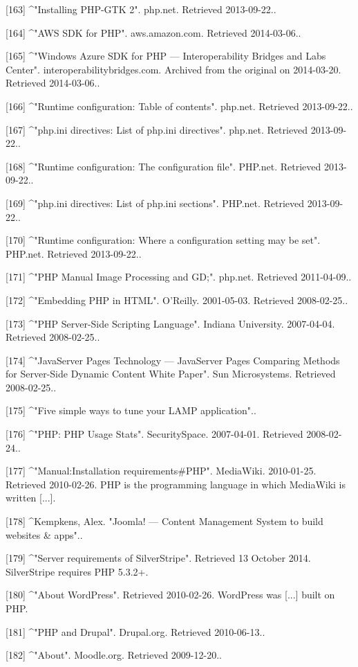 [163]
^"Installing PHP-GTK 2". php.net. Retrieved 2013-09-22..

[164]
^"AWS SDK for PHP". aws.amazon.com. Retrieved 2014-03-06..

[165]
^"Windows Azure SDK for PHP — Interoperability Bridges and Labs Center". interoperabilitybridges.com. Archived from the original on 2014-03-20. Retrieved 2014-03-06..

[166]
^"Runtime configuration: Table of contents". php.net. Retrieved 2013-09-22..

[167]
^"php.ini directives: List of php.ini directives". php.net. Retrieved 2013-09-22..

[168]
^"Runtime configuration: The configuration file". PHP.net. Retrieved 2013-09-22..

[169]
^"php.ini directives: List of php.ini sections". PHP.net. Retrieved 2013-09-22..

[170]
^"Runtime configuration: Where a configuration setting may be set". PHP.net. 
Retrieved 2013-09-22..

[171]
^"PHP Manual Image Processing and GD;". php.net. Retrieved 2011-04-09..

[172]
^"Embedding PHP in HTML". O'Reilly. 2001-05-03. Retrieved 2008-02-25..

[173]
^"PHP Server-Side Scripting Language". Indiana University. 2007-04-04. Retrieved 2008-02-25..

[174]
^"JavaServer Pages Technology — JavaServer Pages Comparing Methods for Server-Side Dynamic Content White Paper". Sun Microsystems. Retrieved 2008-02-25..

[175]
^"Five simple ways to tune your LAMP application"..

[176]
^"PHP: PHP Usage Stats". SecuritySpace. 2007-04-01. Retrieved 2008-02-24..

[177]
^"Manual:Installation requirements#PHP". MediaWiki. 2010-01-25. Retrieved 2010-02-26. PHP is the programming language in which MediaWiki is written [...].

[178]
^Kempkens, Alex. "Joomla! — Content Management System to build websites & apps"..

[179]
^"Server requirements of SilverStripe". Retrieved 13 October 2014. SilverStripe requires PHP 5.3.2+.

[180]
^"About WordPress". Retrieved 2010-02-26. WordPress was [...] built on PHP.

[181]
^"PHP and Drupal". Drupal.org. Retrieved 2010-06-13..

[182]
^"About". Moodle.org. Retrieved 2009-12-20..

